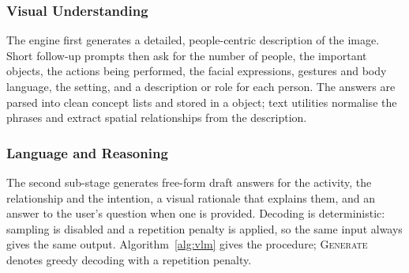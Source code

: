 \subsubsection{Visual Understanding}
The engine first generates a detailed, people-centric description of the image. Short follow-up prompts then ask for the number of people, the important objects, the actions being performed, the facial expressions, gestures and body language, the setting, and a description or role for each person. The answers are parsed into clean concept lists and stored in a  object; text utilities normalise the phrases and extract spatial relationships from the description.

\subsubsection{Language and Reasoning}
The second sub-stage generates free-form draft answers for the activity, the relationship and the intention, a visual rationale that explains them, and an answer to the user's question when one is provided. Decoding is deterministic: sampling is disabled and a repetition penalty is applied, so the same input always gives the same output. Algorithm~\ref{alg:vlm} gives the procedure; \textsc{Generate} denotes greedy decoding with a repetition penalty.

